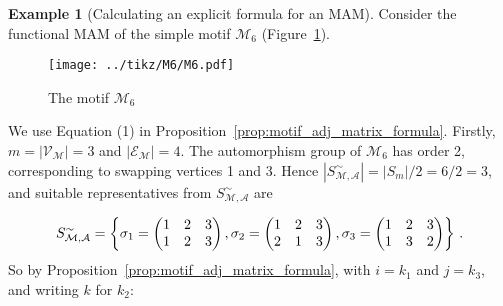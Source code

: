 \documentclass[12pt]{ociamthesis}
\theoremstyle{plain}
\theoremstyle{definition}
\newtheorem{example}{Example}[chapter]
\theoremstyle{remark}
\newcommand\ca[1]{\mathcal{#1}}
\begin{document}
\begin{example}[Calculating an explicit formula for an MAM]
  \label{ex:motif_adj_calc}
  Consider the functional MAM of the simple motif $\ca{M}_6$
  (Figure~\ref{fig:M6}).
  \begin{figure}[H]
    \centering
    \texttt{[image: ../tikz/M6/M6.pdf]}
    \caption{The motif $\ca{M}_6$}
    \label{fig:M6}
  \end{figure}
  We use Equation (1) in Proposition~\ref{prop:motif_adj_matrix_formula}.
  Firstly, $m = |\ca{V_M}| = 3$ and $|\ca{E_M}| = 4$. The automorphism group of
  $\ca{M}_6$ has order 2, corresponding to swapping vertices 1 and 3. Hence
  $|S_\ca{M,A}^\sim| = |S_m| / 2 = 6/2 = 3$, and suitable representatives from
  $S_\ca{M,A}^\sim$ are

  $$ S_\ca{M,A}^\sim = \left\{
    \sigma_1 =
    \begin{pmatrix}
      1 & 2 & 3 \\
      1 & 2 & 3
    \end{pmatrix},
    \sigma_2 =
    \begin{pmatrix}
      1 & 2 & 3 \\
      2 & 1 & 3
    \end{pmatrix},
    \sigma_3 =
    \begin{pmatrix}
      1 & 2 & 3 \\
      1 & 3 & 2
    \end{pmatrix}
  \right\}\,. \vspace*{0.2cm}$$
  So by Proposition~\ref{prop:motif_adj_matrix_formula}, with $i=k_1$ and
  $j=k_3$, and writing $k$ for $k_2$:


\end{example}
\end{document}
